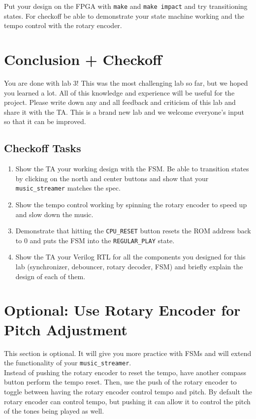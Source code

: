 \documentclass[11pt]{article}
\begin{document}
Put your design on the FPGA with \verb|make| and \verb|make impact| and try transitioning states. For checkoff be able to demonstrate your state machine working and the tempo control with the rotary encoder.

\section{Conclusion + Checkoff}
You are done with lab 3! This was the most challenging lab so far, but we hoped you learned a lot. All of this knowledge and experience will be useful for the project. Please write down any and all feedback and criticism of this lab and share it with the TA. This is a brand new lab and we welcome everyone's input so that it can be improved.\\

\subsection{Checkoff Tasks}

\begin{enumerate}
	\item Show the TA your working design with the FSM. Be able to transition states by clicking on the north and center buttons and show that your \verb|music_streamer| matches the spec.
	
	\item Show the tempo control working by spinning the rotary encoder to speed up and slow down the music.
	
	\item Demonstrate that hitting the \verb|CPU_RESET| button resets the ROM address back to 0 and puts the FSM into the \verb|REGULAR_PLAY| state.
	
	\item Show the TA your Verilog RTL for all the components you designed for this lab (synchronizer, debouncer, rotary decoder, FSM) and briefly explain the design of each of them.
\end{enumerate}

\section{Optional: Use Rotary Encoder for Pitch Adjustment}
This section is optional. It will give you more practice with FSMs and will extend the functionality of your \verb|music_streamer|.\\

Instead of pushing the rotary encoder to reset the tempo, have another compass button perform the tempo reset. Then, use the push of the rotary encoder to toggle between having the rotary encoder control tempo and pitch. By default the rotary encoder can control tempo, but pushing it can allow it to control the pitch of the tones being played as well.
\end{document}
